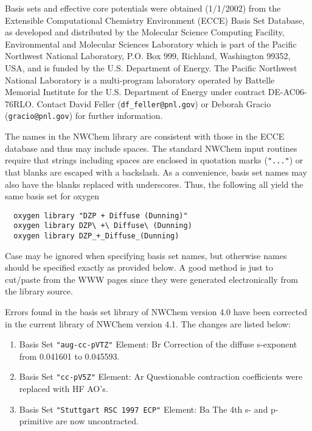 \label{sec:knownbasis}

Basis sets and effective core potentials were obtained (1/1/2002) from
the Extensible Computational Chemistry Environment (ECCE) Basis Set
Database, as developed and distributed by the Molecular Science
Computing Facility, Environmental and Molecular Sciences Laboratory
which is part of the Pacific Northwest National Laboratory, P.O. Box
999, Richland, Washington 99352, USA, and is funded by the
U.S. Department of Energy.  The Pacific Northwest National Laboratory
is a multi-program laboratory operated by Battelle Memorial Institute
for the U.S. Department of Energy under contract DE-AC06-76RLO.
Contact David Feller (\verb+df_feller@pnl.gov+) or Deborah Gracio
(\verb+gracio@pnl.gov+) for further information.

The names in the NWChem library are consistent with those in the ECCE
database and thus may include spaces.  The standard NWChem input
routines require that strings including spaces are enclosed in
quotation marks (\verb+"..."+) or that blanks are escaped with a
backslash.  As a convenience, basis set names may also have the blanks
replaced with underscores.  Thus, the following all yield the same
basis set for oxygen
\begin{verbatim}
  oxygen library "DZP + Diffuse (Dunning)"
  oxygen library DZP\ +\ Diffuse\ (Dunning)
  oxygen library DZP_+_Diffuse_(Dunning)
\end{verbatim}

Case may be ignored when specifying basis set names, but otherwise
names should be specified exactly as provided below.  A good method is
just to cut/paste from the WWW pages since they were generated
electronically from the library source.

Errors found in the basis set library of NWChem version 4.0 have been corrected in 
the current library of NWChem version 4.1. The changes are listed below:

\begin{enumerate}

\item Basis Set \verb#"aug-cc-pVTZ"# \newline 
 Element: Br \newline
 Correction of the diffuse s-exponent from 0.041601 to 0.045593.

\item Basis Set \verb#"cc-pV5Z"# \newline 
 Element: Ar \newline
 Questionable contraction coefficients were replaced with HF AO's.

\item Basis Set \verb#"Stuttgart RSC 1997 ECP"# \newline 
 Element: Ba \newline
 The 4th s- and p-primitive are now uncontracted.

\end{enumerate}

